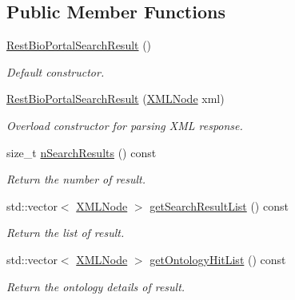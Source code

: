 \subsection*{Public Member Functions}
\begin{DoxyCompactItemize}
\item 
\hyperlink{classunisys_1_1RestBioPortalSearchResult_a699d1ca362420f57e8ffcb9e482c7161}{Rest\-Bio\-Portal\-Search\-Result} ()
\begin{DoxyCompactList}\small\item\em Default constructor. \end{DoxyCompactList}\item 
\hyperlink{classunisys_1_1RestBioPortalSearchResult_a35338e4bfae96a197434b2d4bcbc5b39}{Rest\-Bio\-Portal\-Search\-Result} (\hyperlink{structXMLNode}{X\-M\-L\-Node} xml)
\begin{DoxyCompactList}\small\item\em Overload constructor for parsing X\-M\-L response. \end{DoxyCompactList}\item 
size\-\_\-t \hyperlink{classunisys_1_1RestBioPortalSearchResult_ae4b10ce1cc6ba2404885174faab498ed}{n\-Search\-Results} () const 
\begin{DoxyCompactList}\small\item\em Return the number of result. \end{DoxyCompactList}\item 
std\-::vector$<$ \hyperlink{structXMLNode}{X\-M\-L\-Node} $>$ \hyperlink{classunisys_1_1RestBioPortalSearchResult_aab3a0932b5c7a5ad408ba878960aeebe}{get\-Search\-Result\-List} () const 
\begin{DoxyCompactList}\small\item\em Return the list of result. \end{DoxyCompactList}\item 
std\-::vector$<$ \hyperlink{structXMLNode}{X\-M\-L\-Node} $>$ \hyperlink{classunisys_1_1RestBioPortalSearchResult_af4af03700d9c2b479ed23bc9eca7d014}{get\-Ontology\-Hit\-List} () const 
\begin{DoxyCompactList}\small\item\em Return the ontology details of result. \end{DoxyCompactList}\end{DoxyCompactItemize}

